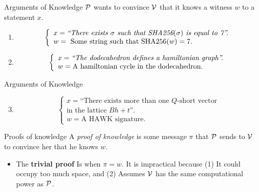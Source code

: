 


\frame{\titlepage}

\begin{frame}{Arguments of Knowledge}
$\mathcal{P}$ wants to convince $\mathcal{V}$ that it knows a witness $w$ to a statement
$x$.
\begin{example}
	\begin{enumerate}
		\item
		\[
			\left\{
			\begin{array}{l}
				x= \mbox{\emph{``There exists
				$\sigma$ such that
				SHA256$(\sigma)$
				is equal to 7''.}}\\
				w=\  \mbox{Some string such that
				SHA256$(w) = 7$.} 
			\end{array}
			\right.
		\]
		\item
		\[
			\left\{
				\begin{array}{l}
					x= \mbox{\emph{``The dodecahedron
					defines a hamiltonian graph''.}}\\
					w= \mbox{A hamiltonian cycle in
					the dodecahedron.}
				\end{array}
			\right.
		\]
	\end{enumerate}
\end{example}
\end{frame}

\begin{frame}{Arguments of Knowledge}
\begin{example}
	\begin{enumerate}
		\setcounter{enumi}{2}
		\item
		\[
			\left\{
				\begin{array}{l}
					x= \mbox{``There exists more than
					one $Q$-short vector}\\
					\mbox{in the lattice
					$Bh+t$''.}\\
					w= \mbox{A HAWK signature.}
				\end{array}
			\right.
		\]
	\end{enumerate}
\end{example}

\begin{block}{Proofs of knowledge}
	A \emph{proof of knowledge} is some message $\pi$ that $\mathcal{P}$ sends
	to $\mathcal{V}$ to convince her that he knows $w$. 
	\begin{itemize}
		\item The \textbf{trivial proof} Is when $\pi= w$. It is
			impractical because (1) It could occupy too much
			space, and (2) Assumes $\mathcal{V}$ has the same
			computational power as $\mathcal{P}$.
	\end{itemize}
\end{block}
\end{frame}

